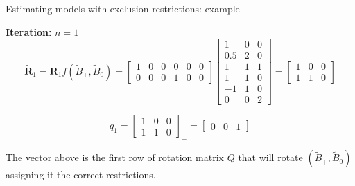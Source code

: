 \documentclass[notes,blackandwhite,mathsans,usenames,dvipsnames]{beamer}
\begin{document}
\begin{frame}{Estimating models with exclusion restrictions: example}

\textbf{Iteration:} $n=1$\small
$$\tilde{\mathbf{R}}_1 = \mathbf{R}_1f(\tilde{B}_+,\tilde{B}_0) = \begin{bmatrix}1&0&0&0&0&0\\ 0&0&0&1&0&0\end{bmatrix} \begin{bmatrix} 1&0&0\\0.5&2&0\\1&1&1\\1&1&0\\-1&1&0\\0&0&2 \end{bmatrix} = \begin{bmatrix} 1&0&0\\1&1&0 \end{bmatrix}$$

$$ q_1 = \begin{bmatrix} 1&0&0\\1&1&0 \end{bmatrix}_{\bot} = \begin{bmatrix} 0&0&1 \end{bmatrix} $$

\smallskip\normalsize {\color{mcxs2}The vector above is the first row of rotation matrix} $Q$ {\color{mcxs2}that will rotate} $(\tilde{B}_+,\tilde{B}_0)$ {\color{mcxs2}assigning it the correct restrictions.}

\end{frame}
\end{document}
